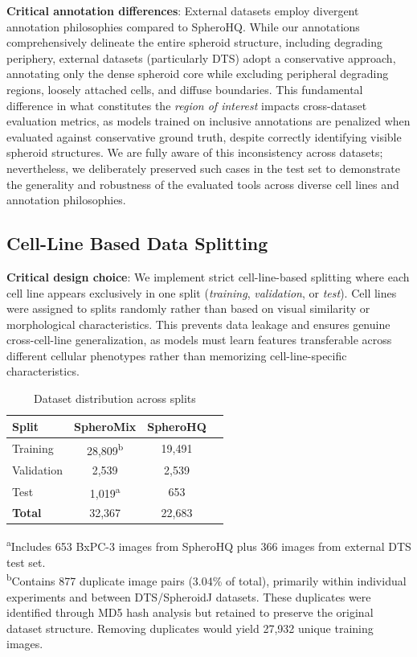 \documentclass[preprint,12pt]{elsarticle}
\newcommand{\dsHQ}{SpheroHQ}
\newcommand{\dsMix}{SpheroMix}
\newcommand{\dsDTS}{DTS}
\begin{document}
\textbf{Critical annotation differences}: External datasets employ divergent annotation philosophies compared to \dsHQ{}. While our annotations comprehensively delineate the entire spheroid structure, including degrading periphery, external datasets (particularly \dsDTS{}) adopt a conservative approach, annotating only the dense spheroid core while excluding peripheral degrading regions, loosely attached cells, and diffuse boundaries. This fundamental difference in what constitutes the \textit{region of interest} impacts cross-dataset evaluation metrics, as models trained on inclusive annotations are penalized when evaluated against conservative ground truth, despite correctly identifying visible spheroid structures. We are fully aware of this inconsistency across datasets; nevertheless, we deliberately preserved such cases in the test set to demonstrate the generality and robustness of the evaluated tools across diverse cell lines and annotation philosophies.

\subsection{Cell-Line Based Data Splitting}

\textbf{Critical design choice}: We implement strict cell-line-based splitting where each cell line appears exclusively in one split (\textit{training}, \textit{validation}, or \textit{test}). Cell lines were assigned to splits randomly rather than based on visual similarity or morphological characteristics. This prevents data leakage and ensures genuine cross-cell-line generalization, as models must learn features transferable across different cellular phenotypes rather than memorizing cell-line-specific characteristics.

\begin{table}[h]
\centering
\caption{Dataset distribution across splits}
\label{tab:dataset_distribution}
\begin{tabular}{lccc}
\hline
\textbf{Split} & \textbf{\dsMix{}} & \textbf{\dsHQ{}} \\
\hline
Training & 28,809\textsuperscript{b} & 19,491 \\
Validation & 2,539 & 2,539 \\
Test & 1,019\textsuperscript{a} & 653 \\
\hline
\textbf{Total} & 32,367 & 22,683 \\
\hline
\end{tabular}
\begin{flushleft}
\footnotesize{\textsuperscript{a}Includes 653 BxPC-3 images from \dsHQ{} plus 366 images from external \dsDTS{} test set.\\
\textsuperscript{b}Contains 877 duplicate image pairs (3.04\% of total), primarily within individual experiments and between DTS/SpheroidJ datasets. These duplicates were identified through MD5 hash analysis but retained to preserve the original dataset structure. Removing duplicates would yield 27,932 unique training images.}
\end{flushleft}
\end{table}
\end{document}
